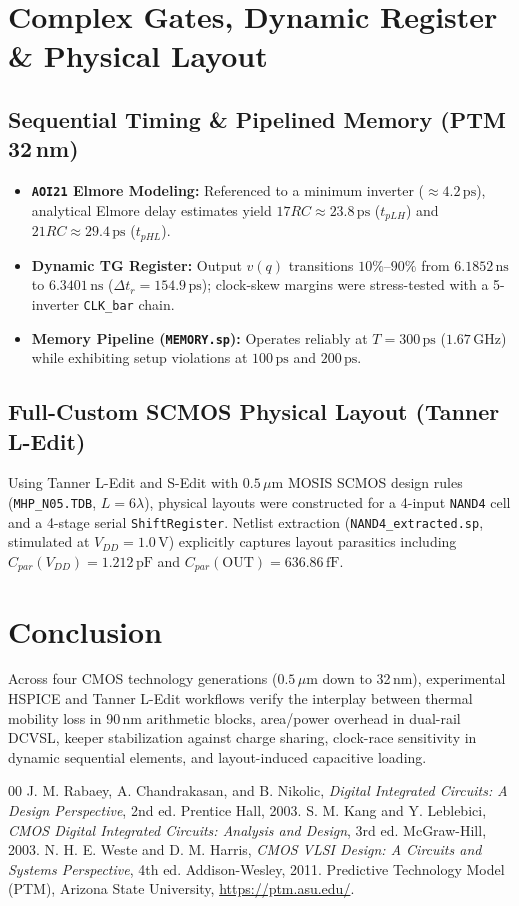 \documentclass[conference]{IEEEtran}
\begin{document}
\section{Complex Gates, Dynamic Register \& Physical Layout}
\subsection{Sequential Timing \& Pipelined Memory (PTM 32\,nm)}
\begin{itemize}
    \item \textbf{\texttt{AOI21} Elmore Modeling:} Referenced to a minimum inverter ($\approx 4.2\,\text{ps}$), analytical Elmore delay estimates yield $17RC \approx 23.8\,\text{ps}$ ($t_{pLH}$) and $21RC \approx 29.4\,\text{ps}$ ($t_{pHL}$).
    \item \textbf{Dynamic TG Register:} Output $v(q)$ transitions $10\%$--$90\%$ from $6.1852\,\text{ns}$ to $6.3401\,\text{ns}$ ($\Delta t_r = 154.9\,\text{ps}$); clock-skew margins were stress-tested with a 5-inverter \texttt{CLK\_bar} chain.
    \item \textbf{Memory Pipeline (\texttt{MEMORY.sp}):} Operates reliably at $T = 300\,\text{ps}$ ($1.67\,\text{GHz}$) while exhibiting setup violations at $100\,\text{ps}$ and $200\,\text{ps}$.
\end{itemize}

\subsection{Full-Custom SCMOS Physical Layout (Tanner L-Edit)}
Using Tanner L-Edit and S-Edit with $0.5\,\mu\text{m}$ MOSIS SCMOS design rules (\texttt{MHP\_N05.TDB}, $L = 6\lambda$), physical layouts were constructed for a 4-input \texttt{NAND4} cell and a 4-stage serial \texttt{ShiftRegister}. Netlist extraction (\texttt{NAND4\_extracted.sp}, stimulated at $V_{DD} = 1.0\,\text{V}$) explicitly captures layout parasitics including $C_{par}(V_{DD}) = 1.212\,\text{pF}$ and $C_{par}(\text{OUT}) = 636.86\,\text{fF}$.

\section{Conclusion}
Across four CMOS technology generations ($0.5\,\mu\text{m}$ down to 32\,nm), experimental HSPICE and Tanner L-Edit workflows verify the interplay between thermal mobility loss in 90\,nm arithmetic blocks, area/power overhead in dual-rail DCVSL, keeper stabilization against charge sharing, clock-race sensitivity in dynamic sequential elements, and layout-induced capacitive loading.

\begin{thebibliography}{00}
 J. M. Rabaey, A. Chandrakasan, and B. Nikolic, \emph{Digital Integrated Circuits: A Design Perspective}, 2nd ed. Prentice Hall, 2003.
 S. M. Kang and Y. Leblebici, \emph{CMOS Digital Integrated Circuits: Analysis and Design}, 3rd ed. McGraw-Hill, 2003.
 N. H. E. Weste and D. M. Harris, \emph{CMOS VLSI Design: A Circuits and Systems Perspective}, 4th ed. Addison-Wesley, 2011.
 Predictive Technology Model (PTM), Arizona State University, \url{https://ptm.asu.edu/}.
\end{thebibliography}
\end{document}
